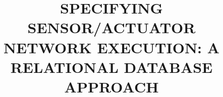 \documentclass[a4paper, 12pt, oneside]{Thesis}  %
\begin{document}
\frontmatter	  %
\title  {SPECIFYING SENSOR/ACTUATOR NETWORK EXECUTION: A RELATIONAL DATABASE APPROACH}

\maketitle


\fancyhead{}  %
\rhead{\thepage}  %
\lhead{}  %
\pagestyle{fancy}  %

\addtocounter{page}{1}
\end{document}
